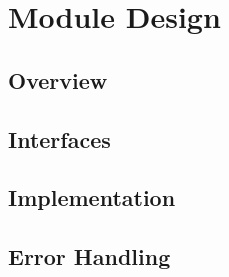 \documentclass[a4paper,twoside]{tce}
\begin{document}




\chapter{Module Design}


\section{Overview}



\section{Interfaces}


\section{Implementation}


\section{Error Handling}
\end{document}
